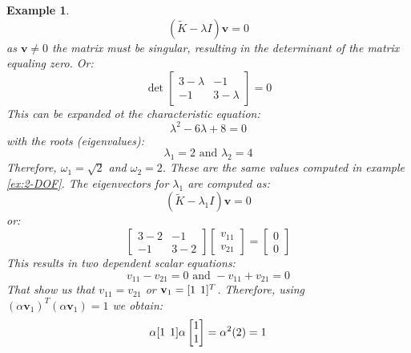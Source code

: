 \documentclass[12pt,letter]{article}
\newtheorem{ex}{Example}
\numberwithin{ex}{section} %
\newenvironment{example}{\begin{mdframed}[middlelinewidth=0.5mm]\begin{ex}\normalfont}{\end{ex}\end{mdframed}}
\numberwithin{re}{section} %
\begin{document}
\begin{example}
\begin{equation}
(\widetilde{K} - \lambda I)\textbf{v} =  0
\end{equation}
as $\textbf{v} \neq 0$ the matrix must be singular, resulting in the determinant of the matrix equaling zero. Or:
\begin{equation}
\det \begin{bmatrix} 3-\lambda & -1 \\    -1  & 3-\lambda \end{bmatrix}  =  0
\end{equation}
This can be expanded ot the characteristic equation:
\begin{equation}
\lambda^2 -6\lambda + 8  =  0
\end{equation}
with the roots (eigenvalues):
\begin{equation}
\lambda_1 = 2\text{ and } \lambda_2 = 4
\end{equation}
Therefore, $\omega_1=\sqrt{2}$ and $\omega_2=2$. These are the same values computed in example \ref{ex:2-DOF}. The eigenvectors for $\lambda_1$ are computed as:
\begin{equation}
(\widetilde{K} - \lambda_1 I)\textbf{v} =  0
\end{equation}
or:
\begin{equation}
\begin{bmatrix} 3-2 & -1 \\    -1  & 3-2 \end{bmatrix} \begin{bmatrix} v_{11} \\ v_{21}  \end{bmatrix} =  \begin{bmatrix} 0 \\ 0  \end{bmatrix}
\end{equation}
This results in two dependent scalar equations:
\begin{equation}
v_{11} - v_{21} = 0 \text{ and } -v_{11} + v_{21} =0
\end{equation}
That show us that $v_{11} = v_{21}$ or $\textbf{v}_1=[1 \hspace{1ex} 1]^T$. Therefore, using $(\alpha \textbf{v}_1)^T(\alpha \textbf{v}_1) = 1$ we obtain:
\begin{equation}
\alpha [1 \hspace{1ex} 1]\alpha  \begin{bmatrix} 1 \\  1 \end{bmatrix}  = \alpha^2(2) = 1

\end{equation}
\end{example}
\end{document}
